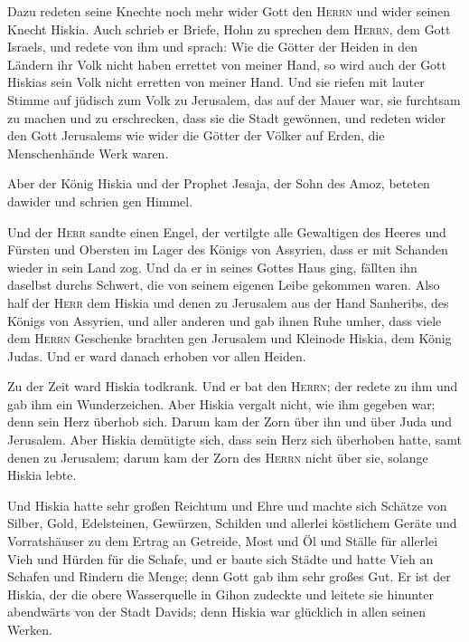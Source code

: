  Dazu redeten seine Knechte noch mehr wider Gott den
\textsc{Herrn} und wider seinen Knecht Hiskia.  Auch
schrieb er Briefe, Hohn zu sprechen dem \textsc{Herrn}, dem Gott
Israels, und redete von ihm und sprach: Wie die Götter der Heiden in den
Ländern ihr Volk nicht haben errettet von meiner Hand, so wird auch der
Gott Hiskias sein Volk nicht erretten von meiner Hand. 
Und sie riefen mit lauter Stimme auf jüdisch zum Volk zu Jerusalem, das
auf der Mauer war, sie furchtsam zu machen und zu erschrecken, dass sie
die Stadt gewönnen,  und redeten wider den Gott
Jerusalems wie wider die Götter der Völker auf Erden, die Menschenhände
Werk waren.

 Aber der König Hiskia und der Prophet Jesaja, der Sohn
des Amoz, beteten dawider und schrien gen Himmel.

 Und der \textsc{Herr} sandte einen Engel, der vertilgte
alle Gewaltigen des Heeres und Fürsten und Obersten im Lager des Königs
von Assyrien, dass er mit Schanden wieder in sein Land zog. Und da er in
seines Gottes Haus ging, fällten ihn daselbst durchs Schwert, die von
seinem eigenen Leibe gekommen waren.  Also half der
\textsc{Herr} dem Hiskia und denen zu Jerusalem aus der Hand Sanheribs,
des Königs von Assyrien, und aller anderen und gab ihnen Ruhe umher,
 dass viele dem \textsc{Herrn} Geschenke brachten gen
Jerusalem und Kleinode Hiskia, dem König Judas. Und er ward danach
erhoben vor allen Heiden.

 Zu der Zeit ward Hiskia todkrank. Und er bat den
\textsc{Herrn}; der redete zu ihm und gab ihm ein Wunderzeichen.
 Aber Hiskia vergalt nicht, wie ihm gegeben war; denn
sein Herz überhob sich. Darum kam der Zorn über ihn und über Juda und
Jerusalem.  Aber Hiskia demütigte sich, dass sein Herz
sich überhoben hatte, samt denen zu Jerusalem; darum kam der Zorn des
\textsc{Herrn} nicht über sie, solange Hiskia lebte.

 Und Hiskia hatte sehr großen Reichtum und Ehre und
machte sich Schätze von Silber, Gold, Edelsteinen, Gewürzen, Schilden
und allerlei köstlichem Geräte  und Vorratshäuser zu dem
Ertrag an Getreide, Most und Öl und Ställe für allerlei Vieh und Hürden
für die Schafe,  und er baute sich Städte und hatte Vieh
an Schafen und Rindern die Menge; denn Gott gab ihm sehr großes Gut.
 Er ist der Hiskia, der die obere Wasserquelle in Gihon
zudeckte und leitete sie hinunter abendwärts von der Stadt Davids; denn
Hiskia war glücklich in allen seinen Werken.

